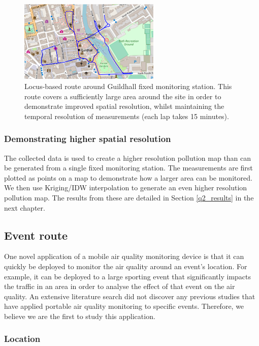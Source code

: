 \documentclass[11pt]{report}
\begin{document}
\begin{figure}[!tb]
\centering
\includegraphics[width=0.6\textwidth]{images/locus_route}
\caption{Locus-based route around Guildhall fixed monitoring station. This route covers a sufficiently large area around the site in order to demonstrate improved spatial resolution, whilst maintaining the temporal resolution of measurements (each lap takes 15 minutes).}
\label{fig: locus_route}
\end{figure}

\subsubsection{Demonstrating higher spatial resolution}

The collected data is used to create a higher resolution pollution map than can be generated from a single fixed monitoring station. The measurements are first plotted as points on a map to demonstrate how a larger area can be monitored. We then use Kriging/IDW interpolation to generate an even higher resolution pollution map. The results from these are detailed in Section \ref{q2_results} in the next chapter.


\subsection{Event route} \label{sec:event}

One novel application of a mobile air quality monitoring device is that it can quickly be deployed to monitor the air quality around an event's location. For example, it can be deployed to a large sporting event that significantly impacts the traffic in an area in order to analyse the effect of that event on the air quality. An extensive literature search did not discover any previous studies that have applied portable air quality monitoring to specific events. Therefore, we believe we are the first to study this application.

\subsubsection{Location}
\end{document}
